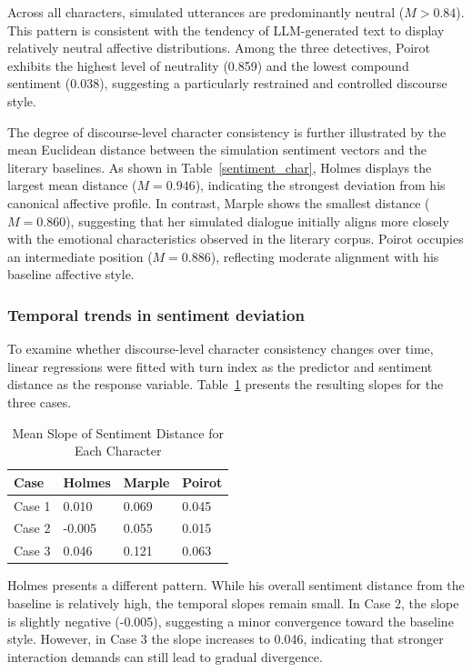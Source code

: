 \documentclass{article}
\begin{document}
Across all characters, simulated utterances are predominantly neutral ($M>0.84$). This pattern is consistent with the tendency of LLM-generated text to display relatively neutral affective distributions. Among the three detectives, Poirot exhibits the highest level of neutrality (0.859) and the lowest compound sentiment (0.038), suggesting a particularly restrained and controlled discourse style.

The degree of discourse-level character consistency is further illustrated by the mean Euclidean distance between the simulation sentiment vectors and the literary baselines. As shown in Table~\ref{sentiment_char}, Holmes displays the largest mean distance ($M=0.946$), indicating the strongest deviation from his canonical affective profile. In contrast, Marple shows the smallest distance ($M=0.860$), suggesting that her simulated dialogue initially aligns more closely with the emotional characteristics observed in the literary corpus. Poirot occupies an intermediate position ($M=0.886$), reflecting moderate alignment with his baseline affective style.


\subsubsection{Temporal trends in sentiment deviation}


To examine whether discourse-level character consistency changes over time, linear regressions were fitted with turn index as the predictor and sentiment distance as the response variable. Table~\ref{sentiment_slope} presents the resulting slopes for the three cases.

\begin{table}[H]
\centering
\begin{tabular}{l l l l}\toprule
Case & Holmes & Marple & Poirot \\\midrule
Case 1 & 0.010 & 0.069 & 0.045 \\
Case 2 & -0.005 & 0.055 & 0.015 \\
Case 3 & 0.046 & 0.121 & 0.063 \\ \bottomrule
\end{tabular}
\caption{Mean Slope of Sentiment Distance for Each Character }
\label{sentiment_slope}
\end{table}

Holmes presents a different pattern. While his overall sentiment distance from the baseline is relatively high, the temporal slopes remain small. In Case 2, the slope is slightly negative (-0.005), suggesting a minor convergence toward the baseline style. However, in Case 3 the slope increases to 0.046, indicating that stronger interaction demands can still lead to gradual divergence.
\end{document}
